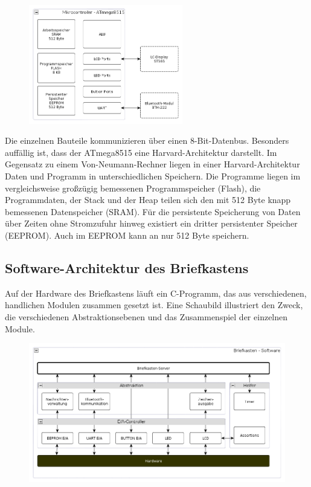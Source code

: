 \documentclass[ngerman]{article}
\begin{document}
\begin{figure}[h!] \begin{center}
    \includegraphics[width=0.6\textwidth]{media/letterbox-atmega-arch}
\end{center} \end{figure}

Die einzelnen Bauteile kommunizieren über einen 8-Bit-Datenbus. Besonders
auffällig ist, dass der ATmega8515 eine Harvard-Architektur darstellt. Im
Gegensatz zu einem Von-Neumann-Rechner liegen in einer Harvard-Architektur
Daten und Programm in unterschiedlichen Speichern. Die Programme liegen im
vergleichsweise großzügig bemessenen Programmspeicher (Flash), die
Programmdaten, der Stack und der Heap teilen sich den mit 512 Byte knapp
bemessenen Datenspeicher (SRAM). Für die persistente Speicherung von Daten über
Zeiten ohne Stromzufuhr hinweg existiert ein dritter persistenter Speicher
(EEPROM). Auch im EEPROM kann an nur 512 Byte speichern.


\subsection{Software-Architektur des Briefkastens}

Auf der Hardware des Briefkastens läuft ein C-Programm, das aus verschiedenen,
handlichen Modulen zusammen gesetzt ist. Eine Schaubild illustriert den Zweck,
die verschiedenen Abstraktionsebenen und das Zusammenspiel der einzelnen
Module.

\begin{figure}[h!] \begin{center}
    \includegraphics[width=\textwidth]{media/letterbox-arch}
\end{center} \end{figure}
\end{document}
